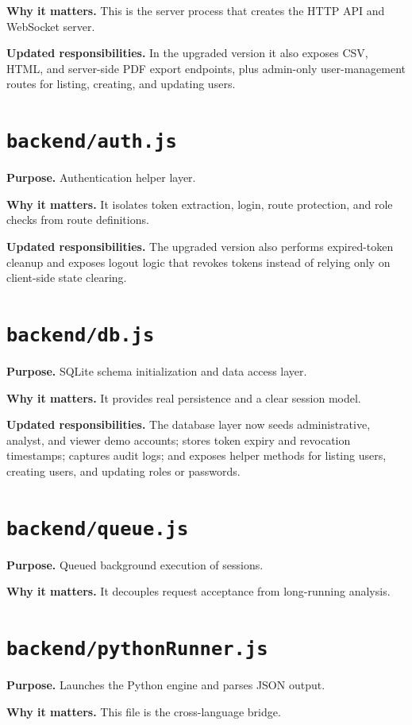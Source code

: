 \documentclass[12pt,a4paper]{report}
\begin{document}
\textbf{Why it matters.} This is the server process that creates the HTTP API and WebSocket server.

\textbf{Updated responsibilities.} In the upgraded version it also exposes CSV, HTML, and server-side PDF export endpoints, plus admin-only user-management routes for listing, creating, and updating users.

\section{\texttt{backend/auth.js}}
\textbf{Purpose.} Authentication helper layer.

\textbf{Why it matters.} It isolates token extraction, login, route protection, and role checks from route definitions.

\textbf{Updated responsibilities.} The upgraded version also performs expired-token cleanup and exposes logout logic that revokes tokens instead of relying only on client-side state clearing.

\section{\texttt{backend/db.js}}
\textbf{Purpose.} SQLite schema initialization and data access layer.

\textbf{Why it matters.} It provides real persistence and a clear session model.

\textbf{Updated responsibilities.} The database layer now seeds administrative, analyst, and viewer demo accounts; stores token expiry and revocation timestamps; captures audit logs; and exposes helper methods for listing users, creating users, and updating roles or passwords.

\section{\texttt{backend/queue.js}}
\textbf{Purpose.} Queued background execution of sessions.

\textbf{Why it matters.} It decouples request acceptance from long-running analysis.

\section{\texttt{backend/pythonRunner.js}}
\textbf{Purpose.} Launches the Python engine and parses JSON output.

\textbf{Why it matters.} This file is the cross-language bridge.
\end{document}
